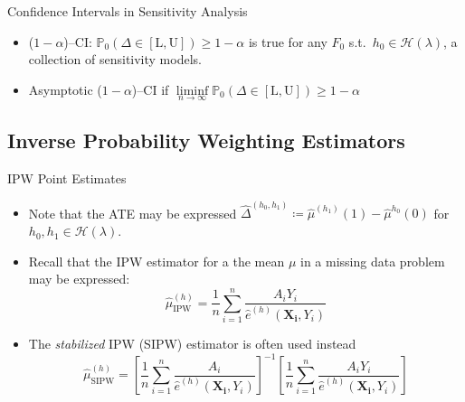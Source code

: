 \documentclass{beamer}
\newcommand{\pr}{\mathbb{P}}
\begin{document}

\begin{frame}{Confidence Intervals in Sensitivity Analysis}

\begin{itemize}
  \itemsep12pt
  \item ($1 - \alpha$)--CI: $\pr_0(\Delta \in [\text{L}, \text{U}]) \geq 1 -
    \alpha$ is true for any $F_0$ s.t.~$h_0 \in \mathcal{H}(\lambda)$, a
    collection of sensitivity models.
  \item Asymptotic ($1 - \alpha$)--CI if $\liminf\limits_{n \rightarrow \infty}
    \pr_0(\Delta \in [\text{L}, \text{U}]) \geq 1 - \alpha$
\end{itemize}

\end{frame}

\subsection{Inverse Probability Weighting Estimators}

\begin{frame}{IPW Point Estimates}

\begin{itemize}
  \itemsep12pt
  \item Note that the ATE may be expressed $\hat{\Delta}^{(h_0, h_1)} \coloneqq
    \hat{\mu}^{(h_1)}(1) - \hat{\mu}^{h_0}(0)$ for $h_0, h_1 \in
    \mathcal{H}(\lambda)$.
  \item Recall that the IPW estimator for a the mean $\mu$ in a missing data
    problem may be expressed:
    \[
      \hat{\mu}^{(h)}_{\text{IPW}} = \frac{1}{n} \sum_{i = 1}^n \frac{A_i
      Y_i}{\hat{e}^(h)(\bm{X_i}, Y_i)}
    \]
  \item The \textit{stabilized} IPW (SIPW) estimator is often used instead
    \[
      \hat{\mu}^{(h)}_{\text{SIPW}} = \left[\frac{1}{n} \sum_{i = 1}^n
      \frac{A_i}{\hat{e}^(h)(\bm{X_i}, Y_i)}\right]^{-1} \left[\frac{1}{n}
      \sum_{i = 1}^n \frac{A_iY_i}{\hat{e}^(h)(\bm{X_i}, Y_i)}\right]
    \]
\end{itemize}

\end{frame}
\end{document}
